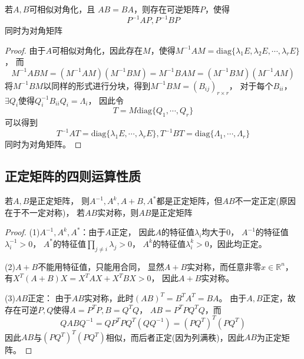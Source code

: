 \begin{theorem}[$AB = BA$同时相似对角化]
  若$A,B$可相似对角化，且
  $AB = BA$，则存在可逆矩阵$P$，使得
  \begin{equation*}
    P^{-1}AP, P^{-1}BP
  \end{equation*}
  同时为对角矩阵
\end{theorem}

\begin{proof}
  由于$A$可相似对角化，因此存在$M$，使得$M^{-1}AM = \mathrm{diag}\{\lambda_1E, \lambda_2 E,\cdots, \lambda_rE\}$，
  而
  \begin{equation*}
    M^{-1}ABM = (M^{-1}AM)(M^{-1}BM) = M^{-1}BAM = (M^{-1}BM)(M^{-1}AM)
  \end{equation*}
  将$M^{-1}BM$以同样的形式进行分块，得到$M^{-1}BM = (B_{ij})_{r \times r}$，
  对于每个$B_{ii}$，$\exists Q_i$使得$Q_i^{-1}B_{ii}Q_i = \Lambda_i$，
  因此令
  \begin{equation*}
    T = M \mathrm{diag}\{Q_1,\cdots,Q_r\}
  \end{equation*}
  可以得到
  \begin{equation*}
    T^{-1}AT = \mathrm{diag}\{\lambda_1E, \cdots, \lambda_rE\},
    T^{-1}BT = \mathrm{diag}\{\Lambda_1,\cdots,\Lambda_r\}
  \end{equation*}
  同时为对角矩阵。
\end{proof}


\subsection{正定矩阵的四则运算性质}


\begin{theorem}[正定的四则运算]
  若$A,B$是正定矩阵，
  则$A^{-1}, A^k, A+B, A^{\ast}$都是正定矩阵，但$AB$不一定正定(原因在于不一定对称)，
  若$AB$实对称，则$AB$是正定矩阵
\end{theorem}

\begin{proof}
  (1)$A^{-1}, A^k, A^{\ast}$：由于$A$正定，
  因此$A$的特征值$\lambda_i$均大于$0$，
  $A^{-1}$的特征值$\lambda_i^{-1} > 0$，
  $A^{\ast}$的特征值$\prod \limits_{j \neq i}\lambda_j > 0$，
  $A^k$的特征值$\lambda_i^k > 0$，因此均正定。

  (2)$A+B$不能用特征值，只能用合同，
  显然$A+B$实对称，而任意非零$ x \in \mathbb{R}^n$，
  有$X^T (A + B)X = X^T AX + X^T BX > 0$，
  因此$A+B$实对称。

  (3)$AB$正定：
  由于$AB$实对称，此时$(AB)^T = B^TA^T = BA$。
  由于$A,B$正定，故存在可逆$P,Q$使得$A = P^TP, B = Q^TQ$，
  $AB = P^TPQ^TQ$，而
  \begin{equation*}
    QABQ^{-1} = QP^TPQ^T(QQ^{-1}) = (PQ^T)^T(PQ^T)
  \end{equation*}
  因此$AB$与$(PQ^T)^T(PQ^T)$相似，而后者正定(因为列满秩)，因此$AB$为正定矩阵。
\end{proof}

